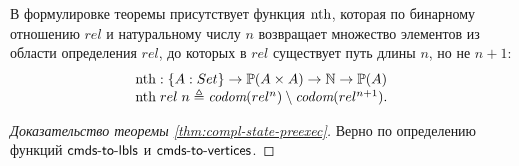 В формулировке теоремы присутствует функция $\mathrm{nth}$, которая по бинарному отношению $rel$ и натуральному числу $n$ возвращает множество элементов
из области определения $rel$, до которых в $rel$ существует путь длины $n$, но не $n+1$:
\[\inarr{
  \nthf : \{A : Set\} \rightarrow \Pset(A \times A) \rightarrow \mathbb{N} \rightarrow \Pset(A) \\
  \nthf \; rel \; n \defeq \codom{rel^{n}} \setminus \codom{rel^{n + 1}}.
}\]

\begin{proof}[Доказательство теоремы \ref{thm:compl-state-preexec}]
  Верно по определению функций $\textup{\sf cmds-to-lbls}$ и $\textup{\sf cmds-to-vertices}$.
\end{proof}
